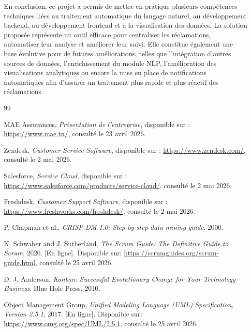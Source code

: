 \documentclass[12pt,a4paper,oneside]{report}
\begin{document}
En conclusion, ce projet a permis de mettre en pratique plusieurs compétences techniques liées au traitement automatique du langage naturel, au développement backend, au développement frontend et à la visualisation des données. La solution proposée représente un outil efficace pour centraliser les réclamations, automatiser leur analyse et améliorer leur suivi. Elle constitue également une base évolutive pour de futures améliorations, telles que l’intégration d’autres sources de données, l’enrichissement du module NLP, l’amélioration des visualisations analytiques ou encore la mise en place de notifications automatiques afin d’assurer un traitement plus rapide et plus réactif des réclamations.

\vspace{-0.6cm}
\begin{thebibliography}{99}
MAE Assurances, \textit{Présentation de l’entreprise}, disponible sur : \url{https://www.mae.tn/}, consulté le 23 avril 2026.

Zendesk, \textit{Customer Service Software}, disponible sur : \url{https://www.zendesk.com/}, consulté le 2 mai 2026.

Salesforce, \textit{Service Cloud}, disponible sur : \url{https://www.salesforce.com/products/service-cloud/}, consulté le 2 mai 2026.

Freshdesk, \textit{Customer Support Software}, disponible sur : \url{https://www.freshworks.com/freshdesk/}, consulté le 2 mai 2026.

P. Chapman et al., \textit{CRISP-DM 1.0: Step-by-step data mining guide}, 2000.

K. Schwaber and J. Sutherland, \textit{The Scrum Guide: The Definitive Guide to Scrum}, 2020. [En ligne]. Disponible sur: \url{https://scrumguides.org/scrum-guide.html}, consulté le 25 avril 2026.

D. J. Anderson, \textit{Kanban: Successful Evolutionary Change for Your Technology Business}. Blue Hole Press, 2010.

Object Management Group, \textit{Unified Modeling Language (UML) Specification, Version 2.5.1}, 2017. [En ligne]. Disponible sur: \url{https://www.omg.org/spec/UML/2.5.1}, consulté le 25 avril 2026.


\end{thebibliography}
\end{document}
